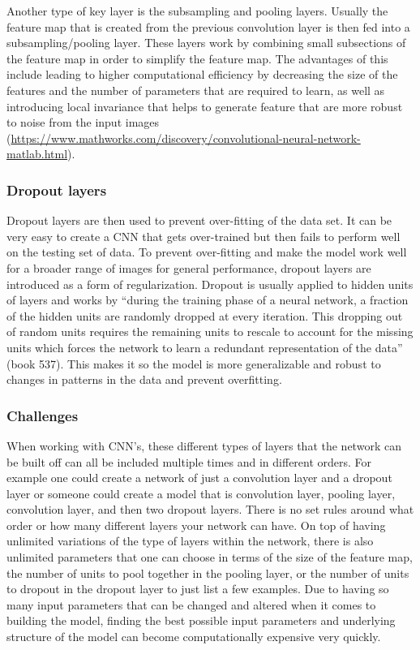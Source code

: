 \documentclass[12pt]{article}
\begin{document}
Another type of key layer is the subsampling and pooling layers. Usually
the feature map that is created from the previous convolution layer is
then fed into a subsampling/pooling layer. These layers work by
combining small subsections of the feature map in order to simplify the
feature map. The advantages of this include leading to higher
computational efficiency by decreasing the size of the features and the
number of parameters that are required to learn, as well as introducing
local invariance that helps to generate feature that are more robust to
noise from the input images
(\url{https://www.mathworks.com/discovery/convolutional-neural-network-matlab.html}).

\hypertarget{dropout-layers}{%
\subsubsection{Dropout layers}\label{dropout-layers}}

Dropout layers are then used to prevent over-fitting of the data set. It
can be very easy to create a CNN that gets over-trained but then fails
to perform well on the testing set of data. To prevent over-fitting and
make the model work well for a broader range of images for general
performance, dropout layers are introduced as a form of regularization.
Dropout is usually applied to hidden units of layers and works by
``during the training phase of a neural network, a fraction of the
hidden units are randomly dropped at every iteration. This dropping out
of random units requires the remaining units to rescale to account for
the missing units which forces the network to learn a redundant
representation of the data'' (book 537). This makes it so the model is
more generalizable and robust to changes in patterns in the data and
prevent overfitting.

\hypertarget{challenges}{%
\subsubsection{Challenges}\label{challenges}}

When working with CNN's, these different types of layers that the
network can be built off can all be included multiple times and in
different orders. For example one could create a network of just a
convolution layer and a dropout layer or someone could create a model
that is convolution layer, pooling layer, convolution layer, and then
two dropout layers. There is no set rules around what order or how many
different layers your network can have. On top of having unlimited
variations of the type of layers within the network, there is also
unlimited parameters that one can choose in terms of the size of the
feature map, the number of units to pool together in the pooling layer,
or the number of units to dropout in the dropout layer to just list a
few examples. Due to having so many input parameters that can be changed
and altered when it comes to building the model, finding the best
possible input parameters and underlying structure of the model can
become computationally expensive very quickly.
\end{document}
